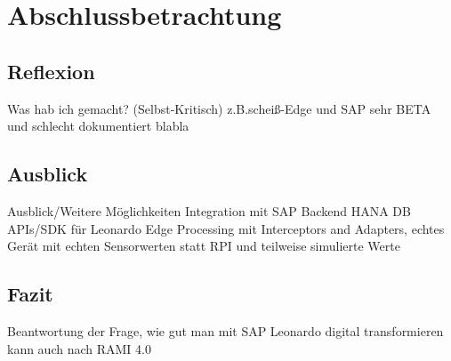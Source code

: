 \section{Abschlussbetrachtung}

\subsection{Reflexion}
Was hab ich gemacht? (Selbst-Kritisch) z.B.scheiß-Edge und SAP sehr BETA und schlecht dokumentiert blabla

\subsection{Ausblick}
Ausblick/Weitere Möglichkeiten
Integration mit SAP Backend
HANA DB
APIs/SDK für Leonardo
Edge Processing mit Interceptors and Adapters, echtes Gerät mit echten Sensorwerten statt RPI und teilweise simulierte Werte

\subsection{Fazit}
Beantwortung der Frage, wie gut man mit SAP Leonardo digital transformieren kann auch nach RAMI 4.0

\newpage